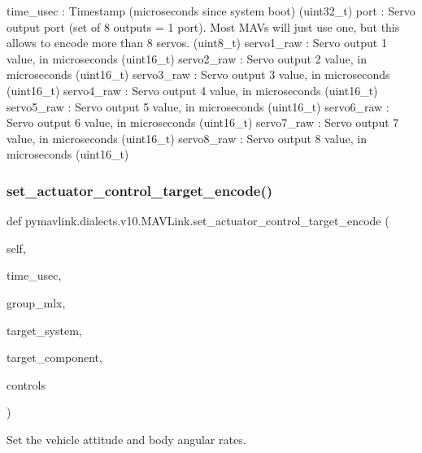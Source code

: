 \begin{DoxyVerb}
\begin{DoxyVerb}
\begin{DoxyVerb}
\begin{DoxyVerb}
\begin{DoxyVerb}
\begin{DoxyVerb}
\begin{DoxyVerb}
\begin{DoxyVerb}
\begin{DoxyVerb}
\begin{DoxyVerb}
\begin{DoxyVerb}
time_usec                 : Timestamp (microseconds since system boot) (uint32_t)
port                      : Servo output port (set of 8 outputs = 1 port). Most MAVs will just use one, but this allows to encode more than 8 servos. (uint8_t)
servo1_raw                : Servo output 1 value, in microseconds (uint16_t)
servo2_raw                : Servo output 2 value, in microseconds (uint16_t)
servo3_raw                : Servo output 3 value, in microseconds (uint16_t)
servo4_raw                : Servo output 4 value, in microseconds (uint16_t)
servo5_raw                : Servo output 5 value, in microseconds (uint16_t)
servo6_raw                : Servo output 6 value, in microseconds (uint16_t)
servo7_raw                : Servo output 7 value, in microseconds (uint16_t)
servo8_raw                : Servo output 8 value, in microseconds (uint16_t)\end{DoxyVerb}
 \mbox{\label{classpymavlink_1_1dialects_1_1v10_1_1MAVLink_a3fb70997e2ab67b47062add4a24e7d66}} 
\subsubsection{\texorpdfstring{set\+\_\+actuator\+\_\+control\+\_\+target\+\_\+encode()}{set\_actuator\_control\_target\_encode()}}
{\footnotesize\ttfamily def pymavlink.\+dialects.\+v10.\+M\+A\+V\+Link.\+set\+\_\+actuator\+\_\+control\+\_\+target\+\_\+encode (\begin{DoxyParamCaption}\item[{}]{self,  }\item[{}]{time\+\_\+usec,  }\item[{}]{group\+\_\+mlx,  }\item[{}]{target\+\_\+system,  }\item[{}]{target\+\_\+component,  }\item[{}]{controls }\end{DoxyParamCaption})}

\begin{DoxyVerb}Set the vehicle attitude and body angular rates.


\end{DoxyVerb}
\end{DoxyVerb}
\end{DoxyVerb}
\end{DoxyVerb}
\end{DoxyVerb}
\end{DoxyVerb}
\end{DoxyVerb}
\end{DoxyVerb}
\end{DoxyVerb}
\end{DoxyVerb}
\end{DoxyVerb}
